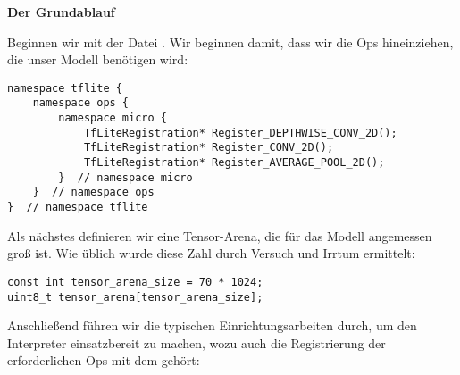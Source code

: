 \textbf{Der Grundablauf}

Beginnen wir mit der Datei . Wir beginnen damit, dass wir die Ops hineinziehen, die unser Modell benötigen wird:

\begin{code}
    

%    

  \begin{lstlisting}
namespace tflite {
    namespace ops {
        namespace micro {
            TfLiteRegistration* Register_DEPTHWISE_CONV_2D();
            TfLiteRegistration* Register_CONV_2D();
            TfLiteRegistration* Register_AVERAGE_POOL_2D();
        }  // namespace micro
    }  // namespace ops
}  // namespace tflite
  \end{lstlisting}
\end{code}


Als nächstes definieren wir eine Tensor-Arena, die für das Modell angemessen groß ist. Wie üblich wurde diese Zahl durch Versuch und Irrtum ermittelt:


\begin{code}
    \begin{lstlisting}
const int tensor_arena_size = 70 * 1024;
uint8_t tensor_arena[tensor_arena_size];
  \end{lstlisting}
\end{code}

Anschließend führen wir die typischen Einrichtungsarbeiten durch, um den Interpreter einsatzbereit zu machen, wozu auch die Registrierung der erforderlichen Ops mit dem  gehört:

